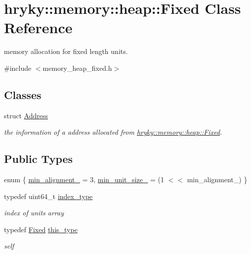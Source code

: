 \hypertarget{classhryky_1_1memory_1_1heap_1_1_fixed}{\section{hryky\-:\-:memory\-:\-:heap\-:\-:Fixed Class Reference}
\label{classhryky_1_1memory_1_1heap_1_1_fixed}
}


memory allocation for fixed length units.  




{\ttfamily \#include $<$memory\-\_\-heap\-\_\-fixed.\-h$>$}

\subsection*{Classes}
\begin{DoxyCompactItemize}
\item 
struct \hyperlink{structhryky_1_1memory_1_1heap_1_1_fixed_1_1_address}{Address}
\begin{DoxyCompactList}\small\item\em the information of a address allocated from \hyperlink{classhryky_1_1memory_1_1heap_1_1_fixed}{hryky\-::memory\-::heap\-::\-Fixed}. \end{DoxyCompactList}\end{DoxyCompactItemize}
\subsection*{Public Types}
\begin{DoxyCompactItemize}
\item 
enum \{ \hyperlink{classhryky_1_1memory_1_1heap_1_1_fixed_a49ff1ac7fdf4d300ad8006669e670d4ca3b7bf349f23c89c7715a49a6007eed98}{min\-\_\-alignment\-\_\-} =  3, 
\hyperlink{classhryky_1_1memory_1_1heap_1_1_fixed_a49ff1ac7fdf4d300ad8006669e670d4ca2f4cc5163f2c1c7f6561e777a1eb2a6a}{min\-\_\-unit\-\_\-size\-\_\-} =  (1 $<$$<$ min\-\_\-alignment\-\_\-)
 \}
\item 
\hypertarget{classhryky_1_1memory_1_1heap_1_1_fixed_a5031234bccd24fe2b2ea6ff6ae5cdcdd}{typedef uint64\-\_\-t \hyperlink{classhryky_1_1memory_1_1heap_1_1_fixed_a5031234bccd24fe2b2ea6ff6ae5cdcdd}{index\-\_\-type}}\label{classhryky_1_1memory_1_1heap_1_1_fixed_a5031234bccd24fe2b2ea6ff6ae5cdcdd}

\begin{DoxyCompactList}\small\item\em index of units array \end{DoxyCompactList}\item 
\hypertarget{classhryky_1_1memory_1_1heap_1_1_fixed_aa25fb42c495f84747ede7cd1ccf1116b}{typedef \hyperlink{classhryky_1_1memory_1_1heap_1_1_fixed}{Fixed} \hyperlink{classhryky_1_1memory_1_1heap_1_1_fixed_aa25fb42c495f84747ede7cd1ccf1116b}{this\-\_\-type}}\label{classhryky_1_1memory_1_1heap_1_1_fixed_aa25fb42c495f84747ede7cd1ccf1116b}

\begin{DoxyCompactList}\small\item\em self \end{DoxyCompactList}\end{DoxyCompactItemize}
